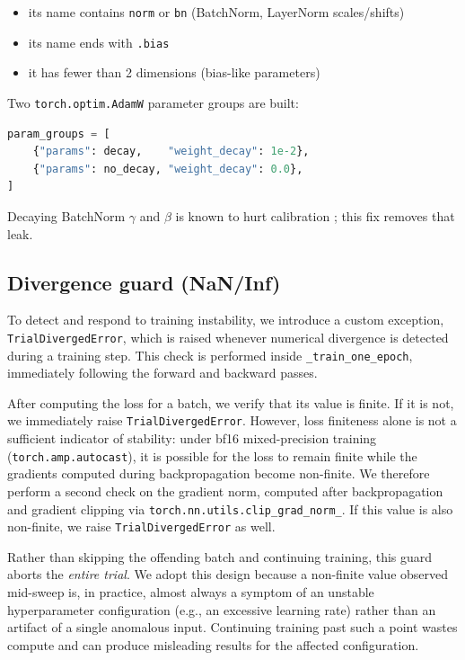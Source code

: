 \documentclass[10pt,a4paper]{article}
\begin{document}
\begin{itemize}[leftmargin=*]
  \item its name contains \texttt{norm} or \texttt{bn} (BatchNorm,
        LayerNorm scales/shifts)
  \item its name ends with \texttt{.bias}
  \item it has fewer than 2 dimensions (bias-like parameters)
\end{itemize}

Two \texttt{torch.optim.AdamW} parameter groups are built:

\begin{lstlisting}[language=Python, basicstyle=\ttfamily\small]
param_groups = [
    {"params": decay,    "weight_decay": 1e-2},
    {"params": no_decay, "weight_decay": 0.0},
]
\end{lstlisting}

Decaying BatchNorm $\gamma$ and $\beta$ is known to hurt calibration
\cite{li:2018:rethinking}; this fix removes that leak.

\subsection{Divergence guard (NaN/Inf)}

To detect and respond to training instability, we introduce a custom exception,
\texttt{TrialDivergedError}, which is raised whenever numerical divergence is
detected during a training step. This check is performed inside
\texttt{\_train\_one\_epoch}, immediately following the forward and backward
passes.

After computing the loss for a batch, we verify that its value is finite. If
it is not, we immediately raise \texttt{TrialDivergedError}. However, loss
finiteness alone is not a sufficient indicator of stability: under bf16
mixed-precision training (\texttt{torch.amp.autocast}), it is possible for the
loss to remain finite while the gradients computed during backpropagation
become non-finite. We therefore perform a second check on the gradient norm,
computed after backpropagation and gradient clipping via
\texttt{torch.nn.utils.clip\_grad\_norm\_}. If this value is also non-finite,
we raise \texttt{TrialDivergedError} as well.

Rather than skipping the offending batch and continuing training, this guard
aborts the \emph{entire trial}. We adopt this design because a non-finite
value observed mid-sweep is, in practice, almost always a symptom of an
unstable hyperparameter configuration (e.g., an excessive learning rate)
rather than an artifact of a single anomalous input. Continuing training past
such a point wastes compute and can produce misleading results for the
affected configuration.
\end{document}
